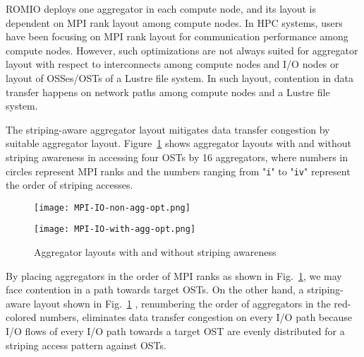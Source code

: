 \documentclass{jhps}
\begin{document}
ROMIO deploys one aggregator in each compute node, and its layout is dependent on
MPI rank layout among compute nodes.
In HPC systems, users have been focusing on MPI rank layout
for communication performance among compute nodes.
However, such optimizations are not always suited for aggregator layout
with respect to interconnects among compute nodes and I/O nodes
or layout of OSSes/OSTs of a Lustre file system.
In such layout, contention in data transfer happens
on network paths among compute nodes and a Lustre file system.

The striping-aware aggregator layout mitigates data transfer congestion
by suitable aggregator layout.
Figure~\ref{fig:AGG_STR_AWARE} shows aggregator layouts with and
without striping awareness in accessing four OSTs by 16 aggregators,
where numbers in circles represent MPI ranks
and the numbers ranging from "{\tt i}" to "{\tt iv}" represent
the order of striping accesses.
%
\begin{figure}[htb]
\centering
\begin{minipage}[t]{0.42\textwidth}
\centering
\texttt{[image: MPI-IO-non-agg-opt.png]}
\label{fig:WO_STR_AWARE}
\end{minipage}
\noindent
\begin{minipage}[t]{0.42\textwidth}
\centering
\texttt{[image: MPI-IO-with-agg-opt.png]}
\label{fig:WITH_STR_AWARE}
\end{minipage}
\caption{Aggregator layouts with and without striping awareness}
\label{fig:AGG_STR_AWARE}
\end{figure}
%
By placing aggregators in the order of MPI ranks
as shown in Fig.~\ref{fig:AGG_STR_AWARE},
we may face contention in a path towards target OSTs.
On the other hand, a striping-aware layout shown in
Fig.~\ref{fig:AGG_STR_AWARE} ,
renumbering the order of aggregators in the red-colored numbers,
eliminates data transfer congestion on every I/O path
because I/O flows of every I/O path towards a target OST are
evenly distributed for a striping access pattern against OSTs.
\end{document}
